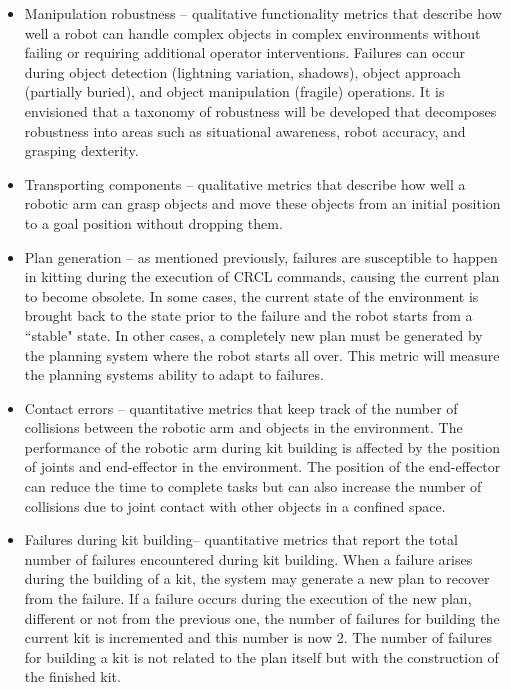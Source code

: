 \begin{itemize}
\item \sf Manipulation robustness \rm -- qualitative functionality metrics that describe how well a robot can handle complex objects in complex environments without failing or requiring additional operator interventions. Failures can occur during object detection (lightning variation, shadows), object approach (partially buried), and object manipulation (fragile) operations.
It is envisioned that a taxonomy of robustness will be developed that decomposes robustness into areas such as situational awareness, robot accuracy, and grasping dexterity.\\

\item \sf Transporting components \rm -- qualitative metrics that describe how well a robotic arm can grasp objects and move these objects from an initial position to a goal position without dropping them.\\

\item \sf Plan generation \rm -- as mentioned previously, failures are susceptible to happen in kitting during the execution of CRCL commands, causing the current plan to become obsolete. In some cases, the current state of the environment is brought back to the state prior to the failure and the robot starts from a ``stable" state. In other cases, a completely new plan must be generated by the planning system where the robot starts all over. This metric will measure the planning systems ability to adapt to failures.\\

\item \sf Contact errors \rm -- quantitative metrics that keep track of the number of collisions between the robotic arm and objects in the environment. The performance of the robotic arm during kit building is affected by the position of joints and end-effector in the environment. The position of the end-effector can reduce the time to complete tasks but can also increase the number of collisions due to joint contact with other objects in a confined space.\\

\item \sf Failures during kit building\rm -- quantitative metrics that report the total number of failures encountered during kit building. When a failure arises during the building of a kit, the system may generate a new plan to recover from the failure. If a failure occurs during the execution of the new plan, different or not from the previous one, the number of failures for building the current kit is incremented and this number is now 2. The number of failures for building a kit is not related to the plan itself but with the construction of the finished kit. \\


\end{itemize}
